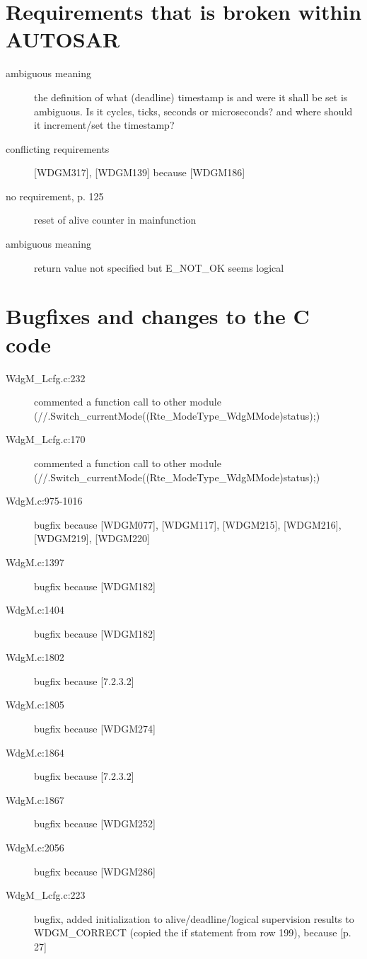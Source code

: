 \documentclass[11pt,a4paper]{article}
\begin{document}
\section{Requirements that is broken within AUTOSAR}
\begin{description}
  \item[ambiguous meaning] the definition of what (deadline) timestamp is and were it shall
    be set is ambiguous. Is it cycles, ticks, seconds or microseconds? and where
    should it increment/set the timestamp?
  \item[conflicting requirements] [WDGM317], [WDGM139] because [WDGM186]
  \item[no requirement, p. 125] reset of alive counter in mainfunction
  \item[ambiguous meaning] return value not specified but E\_NOT\_OK seems logical
\end{description}

\section{Bugfixes and changes to the C code}
\begin{description}
  \item[WdgM\_Lcfg.c:232] \parbox[t]{0.8\linewidth}{commented a function call to other module (//.Switch\_currentMode((Rte\_ModeType\_WdgMMode)status);)}
  \item[WdgM\_Lcfg.c:170] \parbox[t]{0.8\linewidth}{commented a function call to other module
(//.Switch\_currentMode((Rte\_ModeType\_WdgMMode)status);)}
  \item[WdgM.c:975-1016] bugfix because [WDGM077], [WDGM117], [WDGM215],
    [WDGM216], [WDGM219], [WDGM220]
  \item[WdgM.c:1397] bugfix because [WDGM182]
  \item[WdgM.c:1404] bugfix because [WDGM182]
  \item[WdgM.c:1802] bugfix because [7.2.3.2]
  \item[WdgM.c:1805] bugfix because [WDGM274]
  \item[WdgM.c:1864] bugfix because [7.2.3.2]
  \item[WdgM.c:1867] bugfix because [WDGM252]
  \item[WdgM.c:2056] bugfix because [WDGM286]
  \item[WdgM\_Lcfg.c:223] \parbox[t]{0.8\linewidth}{bugfix, added initialization
      to alive/deadline/logical supervision results to WDGM\_CORRECT (copied the
      if statement from row 199), because [p. 27]}
\end{description}
\end{document}
